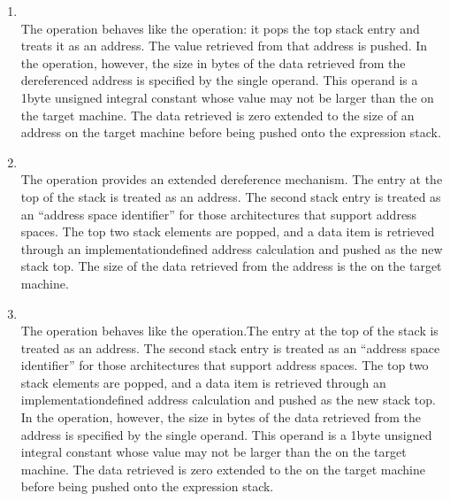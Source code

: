 \begin{enumerate}[1]
\item {} \\
The  operation behaves like the 
operation: it pops the top stack entry and treats it as an
address. The value retrieved from that address is pushed. In
the  operation, however, the size in bytes
of the data retrieved from the dereferenced address is
specified by the single operand. This operand is a 1\dash byte
unsigned integral constant whose value may not be larger
than the  on the target machine. The data
retrieved is zero extended to the size of an address on the
target machine before being pushed onto the expression stack.

\item {} \\
The  operation provides an extended dereference
mechanism. The entry at the top of the stack is treated as an
address. The second stack entry is treated as an ``address
space identifier'' for those architectures that support
address spaces. The top two stack elements are popped,
and a data item is retrieved through an implementation\dash defined
address calculation and pushed as the new stack top. The size
of the data retrieved from the 
address is the
 on the target machine.

\item {}\\
The  operation behaves like the
 operation.The entry at the top of the stack is
treated as an address. The second stack entry is treated as
an ``address space identifier'' for those architectures
that support 
address spaces. The top two stack
elements are popped, and a data item is retrieved through an
implementation\dash defined address calculation and pushed as the
new stack top. In the  operation, however,
the size in bytes of the data retrieved from the 
address is specified by the single operand. This operand is a
1\dash byte unsigned integral constant whose value may not be larger
than the  on the target machine. The data
retrieved is zero extended to the  on the
target machine before being pushed onto the expression stack.


\end{enumerate}
